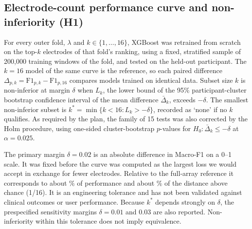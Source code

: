 \subsection{Electrode-count performance curve and non-inferiority (H1)}
For every outer fold, $\lambda$ and $k \in \{1,\ldots,16\}$, XGBoost was retrained from scratch on the top-$k$ electrodes of that fold's ranking, using a fixed, stratified sample of 200,000 training windows of the fold, and tested on the held-out participant. The $k = 16$ model of the same curve is the reference, so each paired difference $\Delta_{p,k} = \mathrm{F1}_{p,k} - \mathrm{F1}_{p,16}$ compares models trained on identical data. Subset size $k$ is non-inferior at margin $\delta$ when $L_k$, the lower bound of the 95\% participant-cluster bootstrap confidence interval of the mean difference $\bar\Delta_k$, exceeds $-\delta$. The smallest non-inferior subset is $k^* = \min\{k < 16 : L_k > -\delta\}$, recorded as `none' if no $k$ qualifies. As required by the plan, the family of 15 tests was also corrected by the Holm procedure, using one-sided cluster-bootstrap $p$-values for $H_0\colon \bar\Delta_k \le -\delta$ at $\alpha = 0.025$.

The primary margin $\delta = 0.02$ is an absolute difference in Macro-F1 on a 0--1 scale. It was fixed before the curve was computed as the largest loss we would accept in exchange for fewer electrodes. Relative to the full-array reference it corresponds to about \MarginPctOfRef\% of performance and about \MarginPctAboveChance\% of the distance above chance (1/16). It is an engineering tolerance and has not been validated against clinical outcomes or user performance. Because $k^*$ depends strongly on $\delta$, the prespecified sensitivity margins $\delta = 0.01$ and $0.03$ are also reported. Non-inferiority within this tolerance does not imply equivalence.

